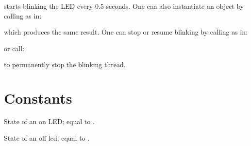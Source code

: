 \documentclass[letterpaper,10pt,english]{sphinxmanual}
\begin{document}
starts blinking the  LED every 0.5 seconds. One can also
instantiate an {\hyperref[\detokenize{index:rcpy.led.Blink}]{}} object by calling
{\hyperref[\detokenize{index:rcpy.led.LED.blink}]{}} as in:

\begin{sphinxVerbatim}[commandchars=\\\{\}]
  
\end{sphinxVerbatim}

which produces the same result. One can stop or resume blinking by calling {\hyperref[\detokenize{index:rcpy.led.Blink.toggle}]{}} as in:

\begin{sphinxVerbatim}[commandchars=\\\{\}]
\end{sphinxVerbatim}

or call:

\begin{sphinxVerbatim}[commandchars=\\\{\}]
\end{sphinxVerbatim}

to permanently stop the blinking thread.


\section{Constants}
\label{\detokenize{index:id5}}

\begin{fulllineitems}
\label{\detokenize{index:rcpy.led.ON}}
State of an on LED; equal to {\hyperref[\detokenize{index:rcpy.gpio.HIGH}]{}}.

\end{fulllineitems}


\begin{fulllineitems}
\label{\detokenize{index:rcpy.led.OFF}}
State of an off led; equal to {\hyperref[\detokenize{index:rcpy.gpio.LOW}]{}}.

\end{fulllineitems}
\end{document}
